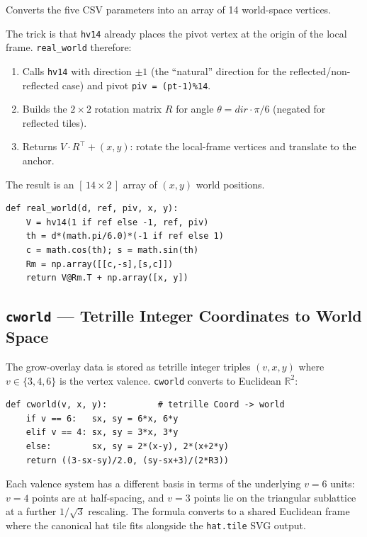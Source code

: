 \documentclass[10pt,a4paper]{article}
\let\polysubsection\subsection
\renewcommand\subsection{\needspace{0.12\textheight}\polysubsection}
\newcommand{\code}[1]{\texttt{\small #1}}
\newcommand{\file}[1]{\texttt{\footnotesize #1}}
\begin{document}
\begin{tcolorbox}[dualbox, title={\code{real\_world(d, ref, piv, x, y)}}]
  Converts the five CSV parameters into an array of 14 world-space vertices.

  The trick is that \code{hv14} already places the pivot vertex at the origin
  of the local frame.  \code{real\_world} therefore:
  \begin{enumerate}
    \item Calls \code{hv14} with direction $\pm 1$ (the ``natural'' direction
      for the reflected/non-reflected case) and pivot \code{piv = (pt-1)\%14}.
    \item Builds the $2\times 2$ rotation matrix $R$ for angle
      $\theta = \mathit{dir}\cdot\pi/6$ (negated for reflected tiles).
    \item Returns $V \cdot R^{\top} + (x, y)$: rotate the local-frame
      vertices and translate to the anchor.
  \end{enumerate}
  The result is an $[\,14\times 2\,]$ array of $(x,y)$ world positions.
\tcblower
\begin{verbatim}
def real_world(d, ref, piv, x, y):
    V = hv14(1 if ref else -1, ref, piv)
    th = d*(math.pi/6.0)*(-1 if ref else 1)
    c = math.cos(th); s = math.sin(th)
    Rm = np.array([[c,-s],[s,c]])
    return V@Rm.T + np.array([x, y])
\end{verbatim}
\end{tcolorbox}

\subsection{\code{cworld} — Tetrille Integer Coordinates to World Space}

The grow-overlay data is stored as tetrille integer triples $(v, x, y)$ where
$v \in \{3, 4, 6\}$ is the vertex valence.  \code{cworld} converts to
Euclidean $\mathbb{R}^2$:

\begin{verbatim}
def cworld(v, x, y):          # tetrille Coord -> world
    if v == 6:   sx, sy = 6*x, 6*y
    elif v == 4: sx, sy = 3*x, 3*y
    else:        sx, sy = 2*(x-y), 2*(x+2*y)
    return ((3-sx-sy)/2.0, (sy-sx+3)/(2*R3))
\end{verbatim}

Each valence system has a different basis in terms of the underlying $v=6$
units: $v=4$ points are at half-spacing, and $v=3$ points lie on the
triangular sublattice at a further $1/\sqrt{3}$ rescaling.  The formula
converts to a shared Euclidean frame where the canonical hat tile fits
alongside the \file{hat.tile} SVG output.
\end{document}
